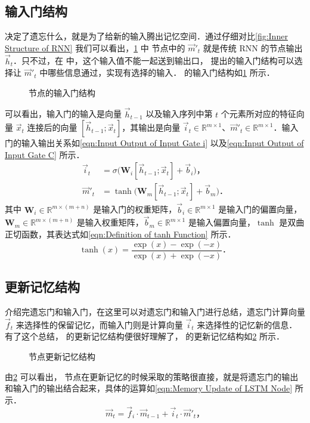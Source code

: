 \subsection{\lstm{} 输入门结构}
决定了遗忘什么，就是为了给新的输入腾出记忆空间．通过仔细对比\cref{fig:Inner Structure of RNN} 我们可以看出，\cref{fig:Input Gate of LSTM} 中 \lstm{} 节点中的 $\vec{m}'_t$ 就是传统 RNN 的节点输出 $\vec{h}_t$．只不过，在 \lstm{} 中，这个输入值不能一起送到输出口，\lstm{} 提出的输入门结构可以选择让 $\vec{m}'_t$ 中哪些信息通过，实现有选择的输入．\lstm{} 的输入门结构如\cref{fig:Input Gate of LSTM} 所示．%
%
\begin{figure}[!htb]
  \centering
  \scalebox{0.7}{}
  \caption{\lstm{} 节点的输入门结构}
  \label{fig:Input Gate of LSTM}
\end{figure}%
%
可以看出，输入门的输入是向量 $\vec{h}_{t-1}$ 以及输入序列中第 $t$ 个元素所对应的特征向量 $\vec{x}_t$ 连接后的向量 $[\vec{h}_{t-1};\vec{x}_t]$，其输出是向量 $\vec{i}_t\in\mathbb{R}^{m\times 1}$、$\vec{m}'_t\in\mathbb{R}^{m\times 1}$．输入门的输入输出关系如\cref{eqn:Input Output of Input Gate i} 以及\cref{eqn:Input Output of Input Gate C} 所示．%
%
\begin{align}
  \label{eqn:Input Output of Input Gate i}
  \vec{i}_t  &= \sigma\big(\bm{W}_i[\vec{h}_{t-1};\vec{x}_t] + \vec{b}_i\big)\text{，}\\
  \label{eqn:Input Output of Input Gate C}
  \vec{m}'_t &= \tanh\big(\bm{W}_m[\vec{h}_{t-1};\vec{x}_t] + \vec{b}_m\big)\text{．}
\end{align}%
%
其中 $\bm{W}_i\in\mathbb{R}^{m\times (m+n)}$ 是输入门的权重矩阵，$\vec{b}_i\in\mathbb{R}^{m\times 1}$ 是输入门的偏置向量，$\bm{W}_m\in\mathbb{R}^{m\times (m+n)}$ 是输入权重矩阵，$\vec{b}_m\in\mathbb{R}^{m\times 1}$ 是输入偏置向量，$\tanh$ 是双曲正切函数，其表达式如\cref{eqn:Definition of tanh Function} 所示．%
%
\begin{equation}\label{eqn:Definition of tanh Function}
  \tanh(x) = \frac{\exp(x) - \exp(-x)}{\exp(x) + \exp(-x)}\text{．}
\end{equation}

\subsection{\lstm{} 更新记忆结构}
介绍完遗忘门和输入门，在这里可以对遗忘门和输入门进行总结，遗忘门计算向量 $\vec{f}_t$ 来选择性的保留记忆，而输入门则是计算向量 $\vec{i}_t$ 来选择性的记忆新的信息．有了这个总结，\lstm{} 的更新记忆结构便很好理解了，\lstm{} 的更新记忆结构如\cref{fig:Cell Update of LSTM} 所示．%
%
\begin{figure}[!htb]
  \centering
  \scalebox{0.7}{}
  \caption{\lstm{} 节点更新记忆结构}
  \label{fig:Cell Update of LSTM}
\end{figure}%
%
由\cref{fig:Cell Update of LSTM} 可以看出，\lstm{} 节点在更新记忆的时候采取的策略很直接，就是将遗忘门的输出和输入门的输出结合起来，具体的运算如\cref{eqn:Memory Update of LSTM Node} 所示．%
%
\begin{equation}\label{eqn:Memory Update of LSTM Node}
  \vec{m}_t = \vec{f}_i\cdot\vec{m}_{t-1} + \vec{i}_t\cdot\vec{m}'_t\text{，}
\end{equation}

